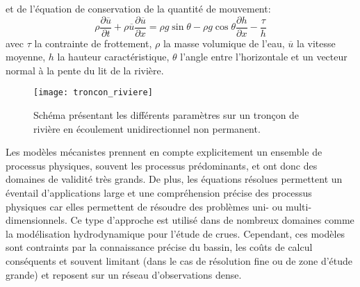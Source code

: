 et de l'équation de conservation de la quantité de mouvement:
\begin{equation}
\rho \frac{\partial \overline{u}}{\partial t} + \rho\overline{u} \frac{\partial \overline{u}}{\partial x} = \rho g \sin\theta - \rho g \cos\theta\frac{\partial h}{\partial x} - \frac{\tau}{h}
\end{equation}
avec $\tau$ la contrainte de frottement, $\rho$ la masse volumique de l'eau, $\overline{u}$ la vitesse moyenne, $h$ la hauteur caractéristique, $\theta$ l'angle entre l'horizontale et un vecteur normal à la pente du lit de la rivière. \\

\begin{figure}[h!]
 \centerline{\texttt{[image: troncon\_riviere]}}
 \caption{Schéma présentant les différents paramètres sur un tronçon de rivière en écoulement unidirectionnel non permanent.}
  \label{troncon}
\end{figure}

Les modèles mécanistes prennent en compte explicitement un ensemble de processus physiques, souvent les processus prédominants, et ont donc des domaines de validité très grands. De plus, les équations résolues permettent un éventail d'applications large et une compréhension précise des processus physiques car elles permettent de résoudre des problèmes uni- ou multi-dimensionnels. Ce type d'approche est utilisé dans de nombreux domaines comme la modélisation hydrodynamique pour l'étude de crues. Cependant, ces modèles sont contraints par la connaissance précise du bassin, les coûts de calcul conséquents et souvent limitant (dans le cas de résolution fine ou de zone d'étude grande) et reposent sur un réseau d'observations dense. \\

